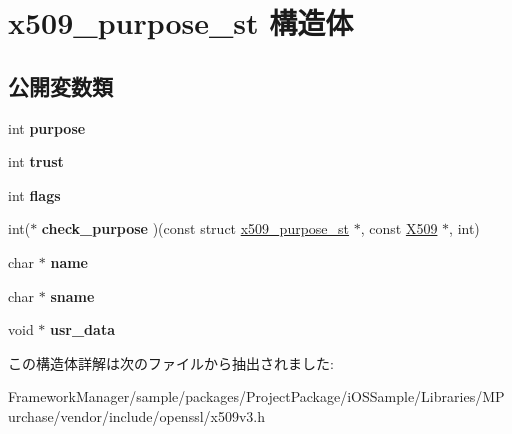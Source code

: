 \hypertarget{structx509__purpose__st}{}\section{x509\+\_\+purpose\+\_\+st 構造体}
\label{structx509__purpose__st}
\subsection*{公開変数類}
\begin{DoxyCompactItemize}
\item 
\hypertarget{structx509__purpose__st_ad1f43f5b4f7cd5114e7c987b5d485a42}{}int {\bfseries purpose}\label{structx509__purpose__st_ad1f43f5b4f7cd5114e7c987b5d485a42}

\item 
\hypertarget{structx509__purpose__st_a2033355e7111f867d6727e2da3e92716}{}int {\bfseries trust}\label{structx509__purpose__st_a2033355e7111f867d6727e2da3e92716}

\item 
\hypertarget{structx509__purpose__st_ad058e4594818ca6291ac4a69586c302b}{}int {\bfseries flags}\label{structx509__purpose__st_ad058e4594818ca6291ac4a69586c302b}

\item 
\hypertarget{structx509__purpose__st_ab424957e81af589729dc0166335c8977}{}int($\ast$ {\bfseries check\+\_\+purpose} )(const struct \hyperlink{structx509__purpose__st}{x509\+\_\+purpose\+\_\+st} $\ast$, const \hyperlink{structx509__st}{X509} $\ast$, int)\label{structx509__purpose__st_ab424957e81af589729dc0166335c8977}

\item 
\hypertarget{structx509__purpose__st_a736be2bbe6bd7c8def80d9c42efb918f}{}char $\ast$ {\bfseries name}\label{structx509__purpose__st_a736be2bbe6bd7c8def80d9c42efb918f}

\item 
\hypertarget{structx509__purpose__st_ada906ff4bac6b5b675a7e325e7424bc5}{}char $\ast$ {\bfseries sname}\label{structx509__purpose__st_ada906ff4bac6b5b675a7e325e7424bc5}

\item 
\hypertarget{structx509__purpose__st_a50555ed3f80ed1a0bfed457c7649c600}{}void $\ast$ {\bfseries usr\+\_\+data}\label{structx509__purpose__st_a50555ed3f80ed1a0bfed457c7649c600}

\end{DoxyCompactItemize}


この構造体詳解は次のファイルから抽出されました\+:\begin{DoxyCompactItemize}
\item 
Framework\+Manager/sample/packages/\+Project\+Package/i\+O\+S\+Sample/\+Libraries/\+M\+Purchase/vendor/include/openssl/x509v3.\+h\end{DoxyCompactItemize}

